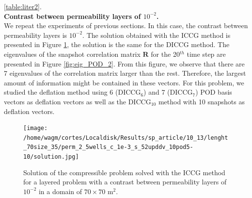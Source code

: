 \documentclass[12pt]{article}
\begin{document}
\ref{table:liter2}.\\
\textbf{Contrast between permeability layers of $10^{-2}$.}\\
We repeat the experiments of previous sections. In this case, the contrast between permeability layers is $10^{-2}$. 
The solution obtained with the ICCG method is presented in Figure \ref{fig:compsol_2}, the solution is the same 
for the DICCG method. The eigenvalues of the snapshot correlation matrix $\mathbf{R}$ for the 20$^{th}$ time 
step are presented in Figure \ref{fig:eig_POD_2}. 
From this figure, we observe that there are 7 eigenvalues of the correlation matrix larger than the rest. 
Therefore, the largest amount of information might be contained in these vectors. For this problem, we studied 
the deflation method using 6 (DICCG$_6$) and 7 (DICCG$_7$) POD basis vectors as deflation vectors as well as 
the DICCG$_{10}$ method with 10 snapshots as deflation vectors. 
\begin{figure}[!h]
\centering
\begin{minipage}{.7\textwidth}
 \centering
\texttt{[image: /home/wagm/cortes/Localdisk/Results/sp\_article/10\_13/lenght\_70size\_35/perm\_2\_5wells\_c\_1e-3\_s\_52upddv\_10pod5-10/solution.jpg]}
\caption{Solution of the compressible problem solved with the ICCG method for a layered problem with a contrast between permeability layers of $10^{-2}$ in a domain of $70 \times 70$ m$^2$.}
\label{fig:compsol_2}
\end{minipage}
\end{figure}
\end{document}
